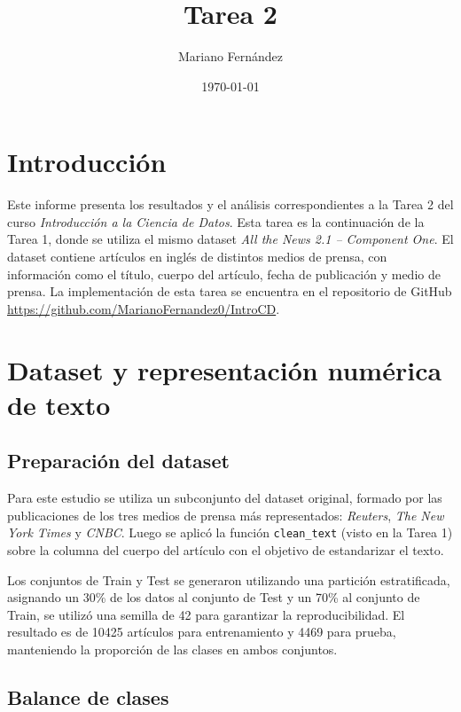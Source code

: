 \documentclass[11pt, a4paper]{article}
\title{\textbf{Tarea 2}}
\author{Mariano Fernández}
\date{\today}
\begin{document}
\maketitle

\tableofcontents
\newpage

\section{Introducción}

Este informe presenta los resultados y el análisis correspondientes a la Tarea 2 del 
curso \textit{Introducción a la Ciencia de Datos}. Esta tarea es la continuación de 
la Tarea 1, donde se utiliza el mismo dataset \textit{All the News 2.1 – Component One}.
El dataset contiene artículos en inglés de distintos medios de prensa, con información 
como el título, cuerpo del artículo, fecha de publicación y medio de prensa. 
La implementación de esta tarea se encuentra en el repositorio de GitHub 
\href{https://github.com/MarianoFernandez0/IntroCD}{https://github.com/MarianoFernandez0/IntroCD}.


\section{Dataset y representación numérica de texto}
\subsection{Preparación del dataset}

Para este estudio se utiliza un subconjunto del dataset original, 
formado por las publicaciones de los tres medios de prensa más representados: 
\textit{Reuters}, \textit{The New York Times} y \textit{CNBC}. 
Luego se aplicó la función \texttt{clean\_text} (visto en la Tarea 1) sobre la columna 
del cuerpo del artículo con el objetivo de estandarizar el texto.

Los conjuntos de Train y Test se generaron utilizando una partición estratificada, 
asignando un 30\% de los datos al conjunto de Test y un 70\% al conjunto de Train, 
se utilizó una semilla de 42 para garantizar la reproducibilidad. 
El resultado es de 10425 artículos para entrenamiento y 4469 para prueba, manteniendo 
la proporción de las clases en ambos conjuntos.

\subsection{Balance de clases}
\end{document}
